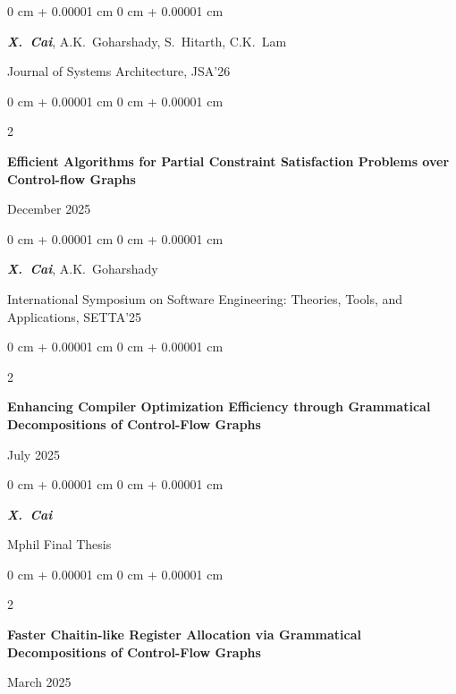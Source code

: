\documentclass[10pt, letterpaper]{article}
\newenvironment{onecolentry}{
    \begin{adjustwidth}{
        0 cm + 0.00001 cm
    }{
        0 cm + 0.00001 cm
    }
}{
    \end{adjustwidth}
} %
\newenvironment{twocolentry}[2][]{
    \onecolentry
    \def\secondColumn{#2}
    \setcolumnwidth{\fill, 4.5 cm}
    \begin{paracol}{2}
}{
    \switchcolumn \raggedleft \secondColumn
    \end{paracol}
    \endonecolentry
} %
\begin{document}
\begin{samepage}
            \vspace{0.10 cm}
            
            \begin{onecolentry}
                \mbox{\textbf{\textit{X. Cai}}}, 
                \mbox{A.K. Goharshady},
                \mbox{S. Hitarth},
                \mbox{C.K. Lam}
                \vspace{0.10 cm}
            
        Journal of Systems Architecture, JSA'26
        \end{onecolentry}

 \vspace{0.2 cm}
             \begin{twocolentry}{
                December 2025
            }
                \textbf{Efficient Algorithms for Partial Constraint Satisfaction Problems over Control-flow Graphs}
            \end{twocolentry}

            \vspace{0.10 cm}
            
            \begin{onecolentry}
                \mbox{\textbf{\textit{X. Cai}}}, 
                \mbox{A.K. Goharshady}
                \vspace{0.10 cm}

International Symposium on Software Engineering: Theories, Tools, and Applications, SETTA'25
        \end{onecolentry}
        \vspace{0.2 cm}
        
         \begin{twocolentry}{
                July 2025
            }
                \textbf{Enhancing Compiler Optimization Efficiency through Grammatical Decompositions of Control-Flow Graphs
}
            \end{twocolentry}

            \vspace{0.10 cm}
            
            \begin{onecolentry}
                \mbox{\textbf{\textit{X. Cai}}}
                \vspace{0.10 cm}
            
        Mphil Final Thesis
        \end{onecolentry}
        \vspace{0.2 cm}
            \begin{twocolentry}{
                March 2025
            }
                \textbf{Faster Chaitin-like Register Allocation via Grammatical Decompositions of Control-Flow Graphs}
            \end{twocolentry}


\end{samepage}
\end{document}
